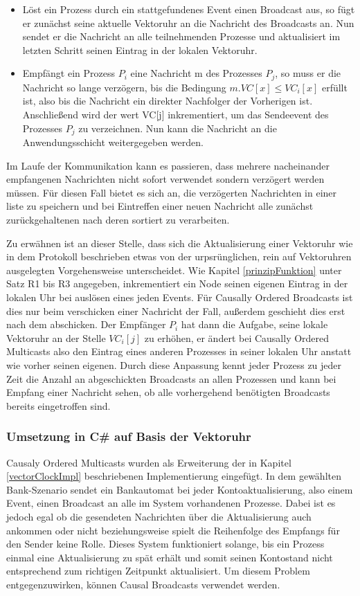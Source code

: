 \begin{itemize}
	\item Löst ein Prozess durch ein stattgefundenes Event einen Broadcast aus, so fügt er zunächst seine aktuelle Vektoruhr an die Nachricht des Broadcasts an. Nun sendet er die Nachricht an alle teilnehmenden Prozesse und aktualisiert im letzten Schritt seinen Eintrag in der lokalen Vektoruhr.
	\item Empfängt ein Prozess $P_i$ eine Nachricht m des Prozesses $P_j$, so muss er die Nachricht so lange verzögern, bis die Bedingung $m.VC[x] \le VC_i[x]$ erfüllt ist, also bis die Nachricht ein direkter Nachfolger der Vorherigen ist. Anschließend wird der wert VC[j] inkrementiert, um das Sendeevent des Prozesses $P_j$ zu verzeichnen. Nun kann die Nachricht an die Anwendungsschicht weitergegeben werden.
\end{itemize}

Im Laufe der Kommunikation kann es passieren, dass mehrere nacheinander empfangenen Nachrichten nicht sofort verwendet sondern verzögert werden müssen. Für diesen Fall bietet es sich an, die verzögerten Nachrichten in einer liste zu speichern und bei Eintreffen einer neuen Nachricht alle zunächst zurückgehaltenen nach deren  sortiert zu verarbeiten.

Zu erwähnen ist an dieser Stelle, dass sich die Aktualisierung einer Vektoruhr wie in dem Protokoll beschrieben etwas von der urpsrünglichen, rein auf Vektoruhren ausgelegten Vorgehensweise unterscheidet. Wie Kapitel \ref{prinzipFunktion} unter Satz R1 bis R3 angegeben, inkrementiert ein Node seinen eigenen Eintrag in der lokalen Uhr bei auslösen eines jeden Events. Für Causally Ordered Broadcasts ist dies nur beim verschicken einer Nachricht der Fall, außerdem geschieht dies erst nach dem abschicken. Der Empfänger $P_i$ hat dann die Aufgabe, seine lokale Vektoruhr an der Stelle $VC_i[j]$ zu erhöhen, er ändert bei Causally Ordered Multicasts also den Eintrag eines anderen Prozesses in seiner lokalen Uhr anstatt wie vorher seinen eigenen. Durch diese Anpassung kennt jeder Prozess zu jeder Zeit die Anzahl an abgeschickten Broadcasts an allen Prozessen und kann bei Empfang einer Nachricht sehen, ob alle vorhergehend benötigten Broadcasts bereits eingetroffen sind.

\subsubsection{Umsetzung in C\# auf Basis der Vektoruhr}
Causaly Ordered Multicasts wurden als Erweiterung der in Kapitel \ref{vectorClockImpl} beschriebenen Implementierung eingefügt. In dem gewählten Bank-Szenario sendet ein Bankautomat bei jeder Kontoaktualisierung, also einem Event, einen Broadcast an alle im System vorhandenen Prozesse. Dabei ist es jedoch egal ob die gesendeten Nachrichten über die Aktualisierung auch ankommen oder nicht beziehungsweise spielt die Reihenfolge des Empfangs für den Sender keine Rolle. Dieses System funktioniert solange, bis ein Prozess einmal eine Aktualisierung zu spät erhält und somit seinen Kontostand nicht entsprechend zum richtigen Zeitpunkt aktualisiert. Um diesem Problem entgegenzuwirken, können Causal Broadcasts verwendet werden.

